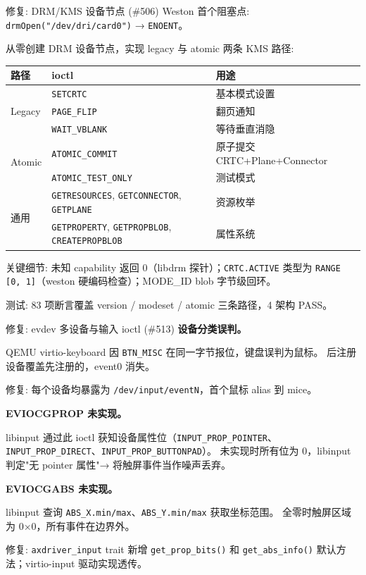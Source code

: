 \documentclass[aspectratio=169,10pt]{ctexbeamer}
\begin{document}
\begin{frame}[shrink=15]{修复: DRM/KMS 设备节点 (\#506)}
Weston 首个阻塞点: \texttt{drmOpen("/dev/dri/card0")} → \texttt{ENOENT}。

\vspace{1mm}
从零创建 DRM 设备节点，实现 legacy 与 atomic 两条 KMS 路径:

\vspace{1mm}
\begin{tabularx}{\textwidth}{p{2.5cm} p{3.5cm} X}
\toprule
\textbf{路径} & \textbf{ioctl} & \textbf{用途} \\
\midrule
\multirow{3}{*}{Legacy} & \texttt{SETCRTC} & 基本模式设置 \\
  & \texttt{PAGE\_FLIP} & 翻页通知 \\
  & \texttt{WAIT\_VBLANK} & 等待垂直消隐 \\
\midrule
\multirow{2}{*}{Atomic} & \texttt{ATOMIC\_COMMIT} & 原子提交 CRTC+Plane+Connector \\
  & \texttt{ATOMIC\_TEST\_ONLY} & 测试模式 \\
\midrule
\multirow{2}{*}{通用} & \texttt{GETRESOURCES}, \texttt{GETCONNECTOR}, \texttt{GETPLANE} & 资源枚举 \\
  & \texttt{GETPROPERTY}, \texttt{GETPROPBLOB}, \texttt{CREATEPROPBLOB} & 属性系统 \\
\bottomrule
\end{tabularx}

\vspace{1mm}
关键细节: 未知 capability 返回 0（libdrm 探针）；\texttt{CRTC.ACTIVE} 类型为
\texttt{RANGE [0, 1]}（weston 硬编码检查）；MODE\_ID blob 字节级回环。

测试: 83 项断言覆盖 version / modeset / atomic 三条路径，4 架构 PASS。
\end{frame}


\begin{frame}[shrink=45]{修复: evdev 多设备与输入 ioctl (\#513)}
\textbf{设备分类误判。}

QEMU virtio-keyboard 因 \texttt{BTN\_MISC} 在同一字节报位，键盘误判为鼠标。
后注册设备覆盖先注册的，event0 消失。

修复: 每个设备均暴露为 \texttt{/dev/input/eventN}，首个鼠标 alias 到 mice。

\vspace{1mm}
\textbf{EVIOCGPROP 未实现。}

libinput 通过此 ioctl 获知设备属性位（\texttt{INPUT\_PROP\_POINTER}、
\texttt{INPUT\_PROP\_DIRECT}、\texttt{INPUT\_PROP\_BUTTONPAD}）。
未实现时所有位为 0，libinput 判定"无 pointer 属性"→ 将触屏事件当作噪声丢弃。

\vspace{1mm}
\textbf{EVIOCGABS 未实现。}

libinput 查询 \texttt{ABS\_X.min/max}、\texttt{ABS\_Y.min/max} 获取坐标范围。
全零时触屏区域为 0×0，所有事件在边界外。

\vspace{1mm}
修复: \texttt{axdriver\_input} trait 新增 \texttt{get\_prop\_bits()} 和
\texttt{get\_abs\_info()} 默认方法；virtio-input 驱动实现透传。
\end{frame}
\end{document}
